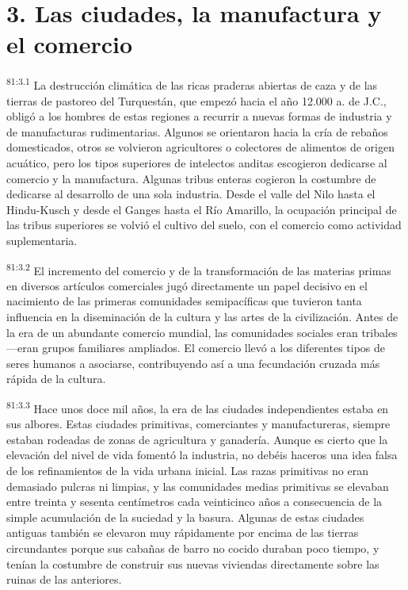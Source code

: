 \section*{3. Las ciudades, la manufactura y el comercio}
\par
\textsuperscript{81:3.1} La destrucción climática de las ricas praderas abiertas de caza y de las tierras de pastoreo del Turquestán, que empezó hacia el año 12.000 a. de J.C., obligó a los hombres de estas regiones a recurrir a nuevas formas de industria y de manufacturas rudimentarias. Algunos se orientaron hacia la cría de rebaños domesticados, otros se volvieron agricultores o colectores de alimentos de origen acuático, pero los tipos superiores de intelectos anditas escogieron dedicarse al comercio y la manufactura. Algunas tribus enteras cogieron la costumbre de dedicarse al desarrollo de una sola industria. Desde el valle del Nilo hasta el Hindu-Kusch y desde el Ganges hasta el Río Amarillo, la ocupación principal de las tribus superiores se volvió el cultivo del suelo, con el comercio como actividad suplementaria.

\par
\textsuperscript{81:3.2} El incremento del comercio y de la transformación de las materias primas en diversos artículos comerciales jugó directamente un papel decisivo en el nacimiento de las primeras comunidades semipacíficas que tuvieron tanta influencia en la diseminación de la cultura y las artes de la civilización. Antes de la era de un abundante comercio mundial, las comunidades sociales eran tribales ---eran grupos familiares ampliados. El comercio llevó a los diferentes tipos de seres humanos a asociarse, contribuyendo así a una fecundación cruzada más rápida de la cultura.

\par
\textsuperscript{81:3.3} Hace unos doce mil años, la era de las ciudades independientes estaba en sus albores. Estas ciudades primitivas, comerciantes y manufactureras, siempre estaban rodeadas de zonas de agricultura y ganadería. Aunque es cierto que la elevación del nivel de vida fomentó la industria, no debéis haceros una idea falsa de los refinamientos de la vida urbana inicial. Las razas primitivas no eran demasiado pulcras ni limpias, y las comunidades medias primitivas se elevaban entre treinta y sesenta centímetros cada veinticinco años a consecuencia de la simple acumulación de la suciedad y la basura. Algunas de estas ciudades antiguas también se elevaron muy rápidamente por encima de las tierras circundantes porque sus cabañas de barro no cocido duraban poco tiempo, y tenían la costumbre de construir sus nuevas viviendas directamente sobre las ruinas de las anteriores.

